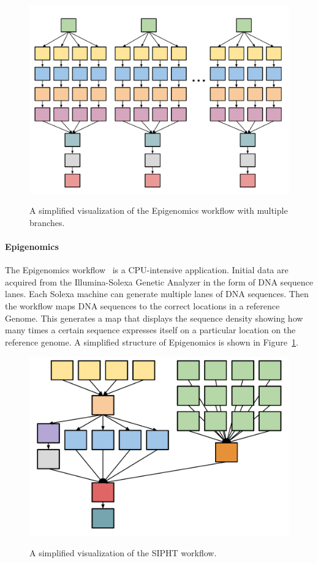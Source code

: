 \begin{figure}[htb]
	\centering
	\includegraphics[width=0.7\linewidth]{figures/workflowsim/genome_shape.pdf} \\
	\caption{A simplified visualization of the Epigenomics workflow with multiple branches.}
	\label{fig:model_shape_genome}
\end{figure}

\paragraph{\textbf{Epigenomics}}
The Epigenomics workflow~\cite{Epigenome} is a CPU-intensive application. Initial data are acquired from the Illumina-Solexa Genetic Analyzer in the form of DNA sequence lanes. Each Solexa machine can generate multiple lanes of DNA sequences. Then the workflow maps DNA sequences to the correct locations in a reference Genome. This generates a map that displays the sequence density showing how many times a certain sequence expresses itself on a particular location on the reference genome. A simplified structure of Epigenomics is shown in Figure~\ref{fig:model_shape_genome}. 

\begin{figure}[htb]
	\centering
	\includegraphics[width=0.5\linewidth]{figures/workflowsim/sipht_shape.pdf} \\
	\caption{A simplified visualization of the SIPHT workflow.}
	\label{fig:model_shape_sipht}
\end{figure}

